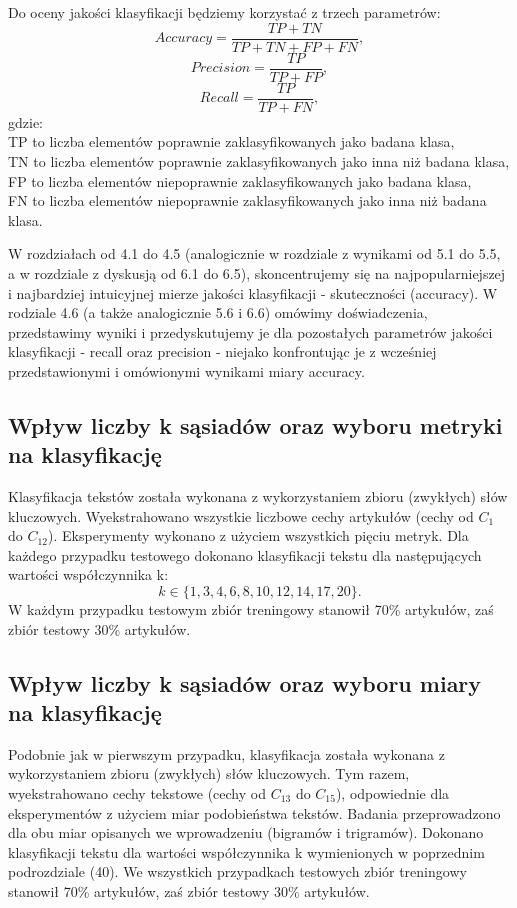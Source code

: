 \documentclass{classrep}
\begin{document}
Do oceny jakości klasyﬁkacji będziemy korzystać z trzech parametrów\cite{wzory}:
\begin{equation}
         Accuracy = \frac{TP + TN}{TP + TN + FP + FN},
 \end{equation}	
\begin{equation}
	Precision = \frac{TP}{TP + FP},
\end{equation}	
\begin{equation}
	Recall = \frac{TP}{TP + FN},
\end{equation}
gdzie:\\
\quad TP to liczba elementów poprawnie zaklasyﬁkowanych jako badana klasa,\\
\quad TN to liczba elementów poprawnie zaklasyﬁkowanych jako inna niż badana klasa,\\
\quad FP to liczba elementów niepoprawnie zaklasyﬁkowanych jako badana klasa,\\
\quad FN to liczba elementów niepoprawnie zaklasyﬁkowanych jako inna niż badana klasa.\newline

W rozdziałach od 4.1 do 4.5 (analogicznie w rozdziale z wynikami od 5.1 do 5.5, a w rozdziale z dyskusją od 6.1 do 6.5), skoncentrujemy się na najpopularniejszej i najbardziej intuicyjnej mierze jakości klasyfikacji - skuteczności (accuracy). W rodziale 4.6 (a także analogicznie 5.6 i 6.6) omówimy doświadczenia, przedstawimy wyniki i przedyskutujemy je dla pozostałych parametrów jakości klasyfikacji - recall oraz precision - niejako konfrontując je z wcześniej przedstawionymi i omówionymi wynikami miary accuracy.


\subsection{Wpływ liczby k sąsiadów oraz wyboru metryki na klasyfikację}
Klasyfikacja tekstów została wykonana z wykorzystaniem zbioru (zwykłych) słów kluczowych. Wyekstrahowano wszystkie liczbowe cechy artykułów (cechy od $C_1$ do $C_{12}$). Eksperymenty wykonano z użyciem wszystkich pięciu metryk. Dla każdego przypadku testowego dokonano klasyfikacji tekstu dla następujących wartości współczynnika k:
\begin{equation}
            k \in \{1, 3, 4, 6, 8, 10, 12, 14, 17, 20\}.
 \end{equation}
W każdym przypadku testowym zbiór treningowy stanowił 70\% artykułów, zaś zbiór testowy 30\% artykułów.

\subsection{Wpływ liczby k sąsiadów oraz wyboru miary na klasyfikację}
Podobnie jak w pierwszym przypadku, klasyfikacja została wykonana z wykorzystaniem zbioru (zwykłych) słów kluczowych. Tym razem, wyekstrahowano cechy tekstowe (cechy od $C_{13}$ do $C_{15}$), odpowiednie dla eksperymentów z użyciem miar podobieństwa tekstów. Badania przeprowadzono dla obu miar opisanych we wprowadzeniu (bigramów i trigramów). Dokonano klasyfikacji tekstu dla wartości współczynnika k wymienionych w poprzednim podrozdziale (40). We wszystkich przypadkach testowych zbiór treningowy stanowił 70\% artykułów, zaś zbiór testowy 30\% artykułów.
\end{document}
